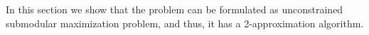 In this section we show that the problem can be formulated as unconstrained
submodular maximization problem, and thus, it has a 2-approximation algorithm.
